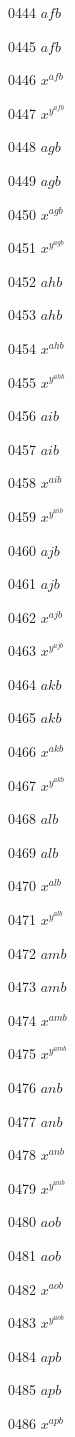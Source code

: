 \documentclass{article}
\begin{document}
0444 $afb$\par
0445 $\displaystyle afb$\par
0446 $x^{afb}$\par
0447 $x^{y^{afb}}$\par
0448 $agb$\par
0449 $\displaystyle agb$\par
0450 $x^{agb}$\par
0451 $x^{y^{agb}}$\par
0452 $ahb$\par
0453 $\displaystyle ahb$\par
0454 $x^{ahb}$\par
0455 $x^{y^{ahb}}$\par
0456 $aib$\par
0457 $\displaystyle aib$\par
0458 $x^{aib}$\par
0459 $x^{y^{aib}}$\par
0460 $ajb$\par
0461 $\displaystyle ajb$\par
0462 $x^{ajb}$\par
0463 $x^{y^{ajb}}$\par
0464 $akb$\par
0465 $\displaystyle akb$\par
0466 $x^{akb}$\par
0467 $x^{y^{akb}}$\par
0468 $alb$\par
0469 $\displaystyle alb$\par
0470 $x^{alb}$\par
0471 $x^{y^{alb}}$\par
0472 $amb$\par
0473 $\displaystyle amb$\par
0474 $x^{amb}$\par
0475 $x^{y^{amb}}$\par
0476 $anb$\par
0477 $\displaystyle anb$\par
0478 $x^{anb}$\par
0479 $x^{y^{anb}}$\par
0480 $aob$\par
0481 $\displaystyle aob$\par
0482 $x^{aob}$\par
0483 $x^{y^{aob}}$\par
0484 $apb$\par
0485 $\displaystyle apb$\par
0486 $x^{apb}$\par
\end{document}
